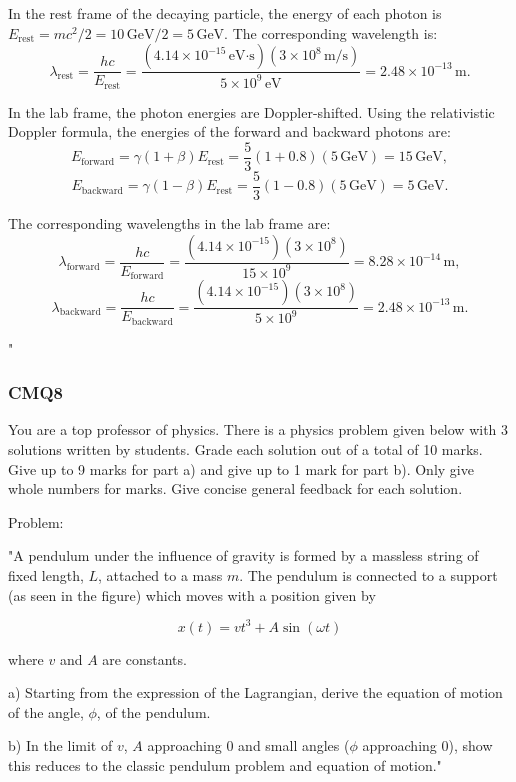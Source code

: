 In the rest frame of the decaying particle, the energy of each photon is \(E_\text{rest} = mc^2/2 = 10 \, \text{GeV}/2 = 5 \, \text{GeV}\). The corresponding wavelength is:
\[
\lambda_\text{rest} = \frac{hc}{E_\text{rest}} = \frac{(4.14 \times 10^{-15} \, \text{eV·s})(3 \times 10^8 \, \text{m/s})}{5 \times 10^9 \, \text{eV}} = 2.48 \times 10^{-13} \, \text{m}.
\]

In the lab frame, the photon energies are Doppler-shifted. Using the relativistic Doppler formula, the energies of the forward and backward photons are:
\[
E_\text{forward} = \gamma (1+\beta) E_\text{rest} = \frac{5}{3} (1+0.8)(5 \, \text{GeV}) = 15 \, \text{GeV},
\]
\[
E_\text{backward} = \gamma (1-\beta) E_\text{rest} = \frac{5}{3} (1-0.8)(5 \, \text{GeV}) = 5 \, \text{GeV}.
\]

The corresponding wavelengths in the lab frame are:
\[
\lambda_\text{forward} = \frac{hc}{E_\text{forward}} = \frac{(4.14 \times 10^{-15})(3 \times 10^8)}{15 \times 10^9} = 8.28 \times 10^{-14} \, \text{m},
\]
\[
\lambda_\text{backward} = \frac{hc}{E_\text{backward}} = \frac{(4.14 \times 10^{-15})(3 \times 10^8)}{5 \times 10^9} = 2.48 \times 10^{-13} \, \text{m}.
\]

"

\subsubsection{CMQ8}

You are a top professor of physics. There is a physics problem given below with 3 solutions written by students. Grade each solution out of a total of 10 marks. Give up to 9 marks for part a) and give up to 1 mark for part b). Only give whole numbers for marks. Give concise general feedback for each solution.

Problem:

"A pendulum under the influence of gravity is formed by a massless string of fixed length, \( L \), attached to a mass \( m \). The pendulum is connected to a support (as seen in the figure) which moves with a position given by 

\[ x(t) = v t^3 + A \sin(\omega t) \]
    
where \( v \) and \( A \) are constants.
    
a) Starting from the expression of the Lagrangian, derive the equation of motion of the angle, \( \phi \), of the pendulum. 
    
b) In the limit of \( v \), \(A\) approaching 0 and small angles (\( \phi \) approaching 0), show this reduces to the classic pendulum problem and equation of motion."

